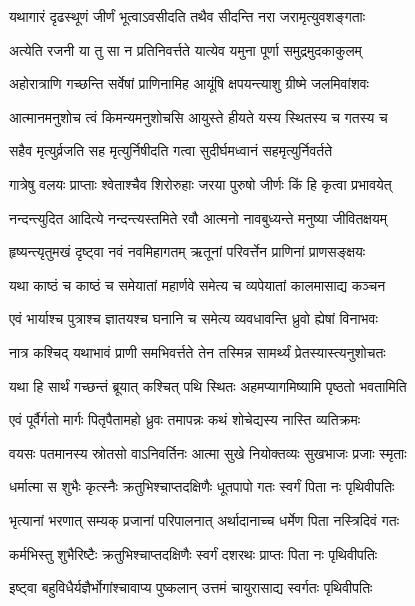 \twolineshloka
{यथागारं दृढस्थूणं जीर्णं भूत्वाऽवसीदति}
{तथैव सीदन्ति नरा जरामृत्युवशङ्गताः} %

\twolineshloka
{अत्येति रजनी या तु सा न प्रतिनिवर्त्तते}
{यात्येव यमुना पूर्णा समुद्रमुदकाकुलम्} %

\twolineshloka
{अहोरात्राणि गच्छन्ति सर्वेषां प्राणिनामिह}
{आयूंषि क्षपयन्त्याशु ग्रीष्मे जलमिवांशवः} %

\twolineshloka
{आत्मानमनुशोच त्वं किमन्यमनुशोचसि}
{आयुस्ते हीयते यस्य स्थितस्य च गतस्य च} %

\twolineshloka
{सहैव मृत्युर्व्रजति सह मृत्युर्निषीदति}
{गत्वा सुदीर्घमध्वानं सहमृत्युर्निवर्तते} %

\twolineshloka
{गात्रेषु वलयः प्राप्ताः श्वेताश्चैव शिरोरुहाः}
{जरया पुरुषो जीर्णः किं हि कृत्वा प्रभावयेत्} %

\twolineshloka
{नन्दन्त्युदित आदित्ये नन्दन्त्यस्तमिते रवौ}
{आत्मनो नावबुध्यन्ते मनुष्या जीवितक्षयम्} %

\twolineshloka
{हृष्यन्त्यृतुमखं दृष्ट्वा नवं नवमिहागतम्}
{ऋतूनां परिवर्त्तेन प्राणिनां प्राणसङ्क्षयः} %

\twolineshloka
{यथा काष्ठं च काष्ठं च समेयातां महार्णवे}
{समेत्य च व्यपेयातां कालमासाद्य कञ्चन} %

\twolineshloka
{एवं भार्याश्च पुत्राश्च ज्ञातयश्च घनानि च}
{समेत्य व्यवधावन्ति ध्रुवो ह्येषां विनाभवः} %

\twolineshloka
{नात्र कश्चिद् यथाभावं प्राणी समभिवर्त्तते}
{तेन तस्मिन्न सामर्थ्यं प्रेतस्यास्त्यनुशोचतः} %

\twolineshloka
{यथा हि सार्थं गच्छन्तं ब्रूयात् कश्चित् पथि स्थितः}
{अहमप्यागमिष्यामि पृष्ठतो भवतामिति} %

\twolineshloka
{एवं पूर्वैर्गतो मार्गः पितृपैतामहो ध्रुवः}
{तमापन्नः कथं शोचेद्यस्य नास्ति व्यतिक्रमः} %

\twolineshloka
{वयसः पतमानस्य स्रोतसो वाऽनिवर्तिनः}
{आत्मा सुखे नियोक्तव्यः सुखभाजः प्रजाः स्मृताः} %

\twolineshloka
{धर्मात्मा स शुभैः कृत्स्नैः क्रतुभिश्चाप्तदक्षिणैः}
{धूतपापो गतः स्वर्गं पिता नः पृथिवीपतिः} %

\twolineshloka
{भृत्यानां भरणात् सम्यक् प्रजानां परिपालनात्}
{अर्थादानाच्च धर्मेण पिता नस्त्रिदिवं गतः} %

\twolineshloka
{कर्मभिस्तु शुभैरिष्टैः क्रतुभिश्चाप्तदक्षिणैः}
{स्वर्गं दशरथः प्राप्तः पिता नः पृथिवीपतिः} %

\twolineshloka
{इष्ट्वा बहुविधैर्यज्ञैर्भोगांश्चावाप्य पुष्कलान्}
{उत्तमं चायुरासाद्य स्वर्गतः पृथिवीपतिः} %

